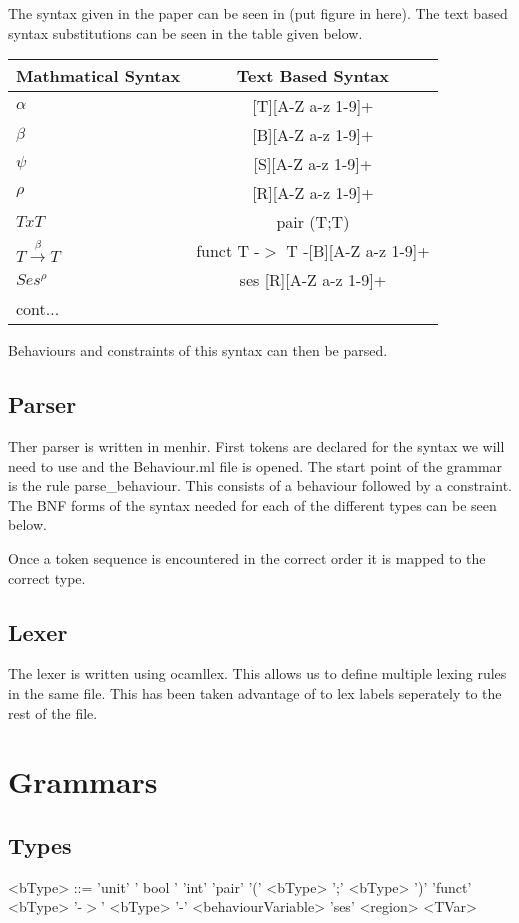 \documentclass[12pt]{article}
\begin{document}
The syntax given in the paper can be seen in (put figure in here). The text based syntax substitutions can be seen in the table given below. 

\begin{tabular}{l c }
Mathmatical Syntax & Text Based Syntax \\
\hline
$\alpha$ & [T][A-Z a-z 1-9]+ \\
$\beta$ & [B][A-Z a-z 1-9]+ \\
$\psi$ & [S][A-Z a-z 1-9]+ \\
$\rho$ & [R][A-Z a-z 1-9]+ \\
$T x T$ & pair (T;T) \\
$ T\overset{\beta}{\rightarrow}T $ & funct T -$>$ T -[B][A-Z a-z 1-9]+ \\
$Ses^\rho$ & ses [R][A-Z a-z 1-9]+ \\
cont...

\end{tabular}

Behaviours and constraints of this syntax can then be parsed. 

\subsection{Parser}

Ther parser is written in menhir. First tokens are declared for the syntax we will need to use and the Behaviour.ml file is opened. The start point of the grammar is the rule parse_behaviour. This consists of a behaviour followed by a constraint. The BNF forms of the syntax needed for each of the different types can be seen below. 

Once a token sequence is encountered in the correct order it is mapped to the correct type. 

\subsection{Lexer}

The lexer is written using ocamllex. This allows us to define multiple lexing rules in the same file. This has been taken advantage of to lex labels seperately to the rest of the file. 

\section {Grammars}

\subsection{Types}
\begin{grammar}

<bType> ::= 'unit'
\alt ' bool '
\alt 'int'
\alt 'pair' '(' <bType> ';' <bType> ')'
\alt 'funct' <bType> '-$>$' <bType> '-' <behaviourVariable>
\alt 'ses' <region>
\alt <TVar>

\end{grammar}
\end{document}
